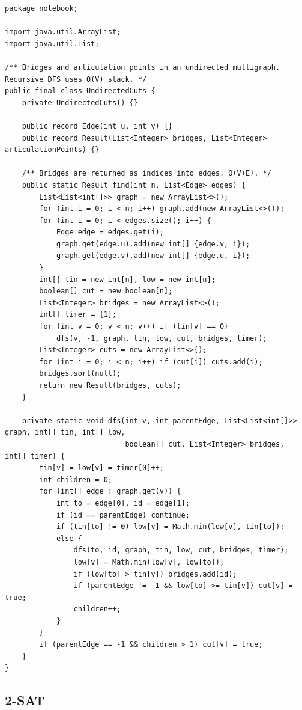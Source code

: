 \documentclass[10pt,letterpaper]{article}
\begin{document}
\begin{lstlisting}
package notebook;

import java.util.ArrayList;
import java.util.List;

/** Bridges and articulation points in an undirected multigraph. Recursive DFS uses O(V) stack. */
public final class UndirectedCuts {
    private UndirectedCuts() {}

    public record Edge(int u, int v) {}
    public record Result(List<Integer> bridges, List<Integer> articulationPoints) {}

    /** Bridges are returned as indices into edges. O(V+E). */
    public static Result find(int n, List<Edge> edges) {
        List<List<int[]>> graph = new ArrayList<>();
        for (int i = 0; i < n; i++) graph.add(new ArrayList<>());
        for (int i = 0; i < edges.size(); i++) {
            Edge edge = edges.get(i);
            graph.get(edge.u).add(new int[] {edge.v, i});
            graph.get(edge.v).add(new int[] {edge.u, i});
        }
        int[] tin = new int[n], low = new int[n];
        boolean[] cut = new boolean[n];
        List<Integer> bridges = new ArrayList<>();
        int[] timer = {1};
        for (int v = 0; v < n; v++) if (tin[v] == 0)
            dfs(v, -1, graph, tin, low, cut, bridges, timer);
        List<Integer> cuts = new ArrayList<>();
        for (int i = 0; i < n; i++) if (cut[i]) cuts.add(i);
        bridges.sort(null);
        return new Result(bridges, cuts);
    }

    private static void dfs(int v, int parentEdge, List<List<int[]>> graph, int[] tin, int[] low,
                            boolean[] cut, List<Integer> bridges, int[] timer) {
        tin[v] = low[v] = timer[0]++;
        int children = 0;
        for (int[] edge : graph.get(v)) {
            int to = edge[0], id = edge[1];
            if (id == parentEdge) continue;
            if (tin[to] != 0) low[v] = Math.min(low[v], tin[to]);
            else {
                dfs(to, id, graph, tin, low, cut, bridges, timer);
                low[v] = Math.min(low[v], low[to]);
                if (low[to] > tin[v]) bridges.add(id);
                if (parentEdge != -1 && low[to] >= tin[v]) cut[v] = true;
                children++;
            }
        }
        if (parentEdge == -1 && children > 1) cut[v] = true;
    }
}
\end{lstlisting}
\subsection{2-SAT}
\end{document}

